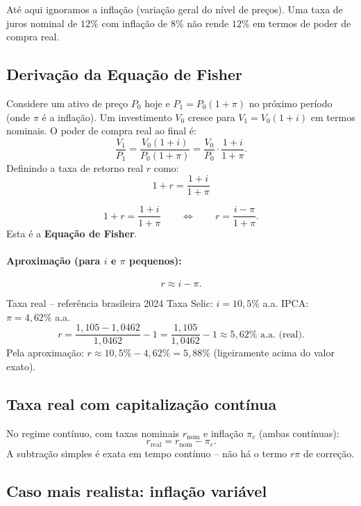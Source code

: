 Até aqui ignoramos a inflação (variação geral do nível de preços). Uma taxa de juros nominal
de $12\%$ com inflação de $8\%$ não rende $12\%$ em termos de poder de compra real.

\subsection{Derivação da Equação de Fisher}

Considere um ativo de preço $P_0$ hoje e $P_1 = P_0(1+\pi)$ no próximo período
(onde $\pi$ é a inflação). Um investimento $V_0$ cresce para $V_1 = V_0(1+i)$ em termos nominais.
O poder de compra real ao final é:
\[
  \frac{V_1}{P_1} = \frac{V_0(1+i)}{P_0(1+\pi)}
                  = \frac{V_0}{P_0} \cdot \frac{1+i}{1+\pi}.
\]
Definindo a taxa de retorno real $r$ como:
\[
  1 + r = \frac{1+i}{1+\pi}
\]

\begin{resultado}
\[
  \boxed{1 + r = \frac{1+i}{1+\pi}}
  \qquad\Leftrightarrow\qquad
  r = \frac{i - \pi}{1 + \pi}.
\]
Esta é a \textbf{Equação de Fisher}.
\end{resultado}

\paragraph{Aproximação (para $i$ e $\pi$ pequenos):}
\[
  r \approx i - \pi.
\]

\begin{exemplo}{Taxa real -- referência brasileira 2024}
Taxa Selic: $i = 10{,}5\%$ a.a. \quad IPCA: $\pi = 4{,}62\%$ a.a.
\[
  r = \frac{1{,}105 - 1{,}0462}{1{,}0462} - 1
    = \frac{1{,}105}{1{,}0462} - 1
    \approx 5{,}62\% \text{ a.a. (real).}
\]
Pela aproximação: $r \approx 10{,}5\% - 4{,}62\% = 5{,}88\%$ (ligeiramente acima do valor exato).
\end{exemplo}

\subsection{Taxa real com capitalização contínua}

No regime contínuo, com taxas nominais $r_{\text{nom}}$ e inflação $\pi_c$ (ambas contínuas):
\[
  r_{\text{real}} = r_{\text{nom}} - \pi_c.
\]
A subtração simples é exata em tempo contínuo -- não há o termo $r\pi$ de correção.

\subsection{Caso mais realista: inflação variável}

